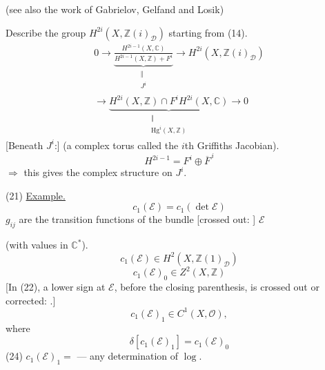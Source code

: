 (see also the work of Gabrielov, Gelfand and Losik)

Describe the group $H^{2i}(X,\mathbb{Z}(i)_{\mathcal D})$ starting from (14).
\begin{equation*}
\begin{gathered}
0\longrightarrow
\underbrace{\frac{H^{2i-1}(X,\mathbb C)}{H^{2i-1}(X,\mathbb Z)+F^i}}_{\substack{\Vert\\ J^i}}
\longrightarrow H^{2i}(X,\mathbb Z(i)_{\mathcal D})\\
\longrightarrow
\underbrace{H^{2i}(X,\mathbb Z)\cap F^iH^{2i}(X,\mathbb C)}_{\substack{\Vert\\ \mathrm{Hg}^i(X,\mathbb Z)}}
\longrightarrow0
\end{gathered}\tag{20}
\end{equation*}
[Beneath $J^i$:] (a complex torus called the $i$th Griffiths Jacobian).
\begin{equation*}
H^{2i-1}=F^i\oplus\overline F^{\,i}
\end{equation*}
$\Rightarrow$ this gives the complex structure on $J^i$.

(21) \underline{Example.}
\begin{equation*}
c_1(\mathcal E)=c_1(\det\mathcal E)
\end{equation*}
$g_{ij}$ are the transition functions of the bundle
[crossed out: ]
$\mathcal E$

(with values in $\mathbb C^*$).
\begin{equation*}
c_1(\mathcal E)\in H^2(X,\mathbb Z(1)_{\mathcal D})
\end{equation*}
\begin{equation*}
c_1(\mathcal E)_0\in Z^2(X,\mathbb Z)\tag{22}
\end{equation*}
[In (22), a lower sign at $\mathcal E$, before the closing parenthesis, is crossed out or corrected:
.]
\begin{equation*}
c_1(\mathcal E)_1\in C^1(X,\mathcal O),\tag{23}
\end{equation*}
where
\begin{equation*}
\delta[c_1(\mathcal E)_1]=c_1(\mathcal E)_0\tag{23'}
\end{equation*}
(24) $c_1(\mathcal E)_1=$
--- any determination of $\log$.

